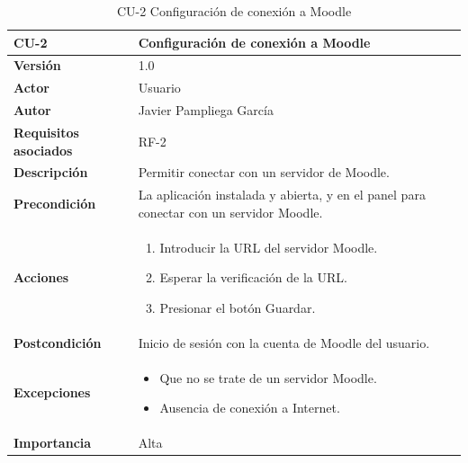 \begin{table}[p]
	\centering
	\begin{tabularx}{\linewidth}{ p{} p{} }
		\toprule
		\textbf{CU-2}    & \textbf{Configuración de conexión a Moodle}\\
		\toprule
		\textbf{Versión}              & 1.0    \\
            \textbf{Actor}                & Usuario \\
		\textbf{Autor}                & Javier Pampliega García \\
		\textbf{Requisitos asociados} & RF-2\\
		\textbf{Descripción}          & Permitir conectar con un servidor de Moodle. \\
		\textbf{Precondición}         & La aplicación instalada y abierta, y en el panel para conectar con un servidor Moodle. \\
		\textbf{Acciones}             &
		\begin{enumerate}
			\def\labelenumi{\arabic{enumi}.}
			\tightlist
			\item Introducir la URL del servidor Moodle.
                \item Esperar la verificación de la URL.
			\item Presionar el botón Guardar.
		\end{enumerate}\\
		\textbf{Postcondición}        & Inicio de sesión con la cuenta de Moodle del usuario. \\
		\textbf{Excepciones}          & \begin{itemize}
		    \item Que no se trate de un servidor Moodle.
                \item Ausencia de conexión a Internet.
		\end{itemize} \\
		\textbf{Importancia}          & Alta \\
		\bottomrule
	\end{tabularx}
	\caption{CU-2 Configuración de conexión a Moodle}
\end{table}

